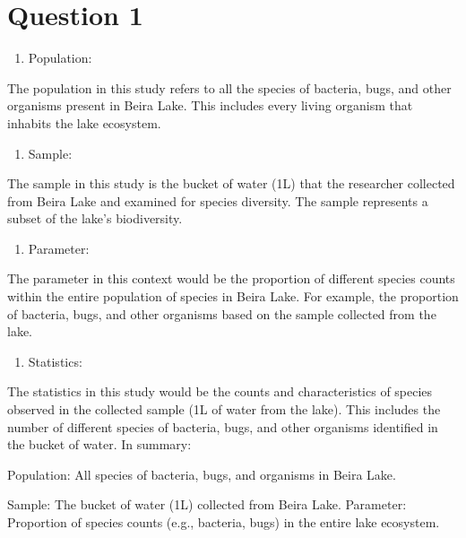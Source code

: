 \documentclass[
]{article}
\author{}
\date{\vspace{-2.5em}}
\providecommand{\tightlist}{%
  \setlength{\itemsep}{0pt}\setlength{\parskip}{0pt}}
\begin{document}
\section{Question 1}\label{question-1}

\begin{enumerate}
\def\labelenumi{\roman{enumi}.}
\tightlist
\item
  Population:
\end{enumerate}

The population in this study refers to all the species of bacteria,
bugs, and other organisms present in Beira Lake. This includes every
living organism that inhabits the lake ecosystem.

\begin{enumerate}
\def\labelenumi{\roman{enumi}.}
\setcounter{enumi}{1}
\tightlist
\item
  Sample:
\end{enumerate}

The sample in this study is the bucket of water (1L) that the researcher
collected from Beira Lake and examined for species diversity. The sample
represents a subset of the lake's biodiversity.

\begin{enumerate}
\def\labelenumi{\roman{enumi}.}
\setcounter{enumi}{2}
\tightlist
\item
  Parameter:
\end{enumerate}

The parameter in this context would be the proportion of different
species counts within the entire population of species in Beira Lake.
For example, the proportion of bacteria, bugs, and other organisms based
on the sample collected from the lake.

\begin{enumerate}
\def\labelenumi{\roman{enumi}.}
\setcounter{enumi}{3}
\tightlist
\item
  Statistics:
\end{enumerate}

The statistics in this study would be the counts and characteristics of
species observed in the collected sample (1L of water from the lake).
This includes the number of different species of bacteria, bugs, and
other organisms identified in the bucket of water. In summary:

Population: All species of bacteria, bugs, and organisms in Beira Lake.

Sample: The bucket of water (1L) collected from Beira Lake. Parameter:
Proportion of species counts (e.g., bacteria, bugs) in the entire lake
ecosystem.
\end{document}
